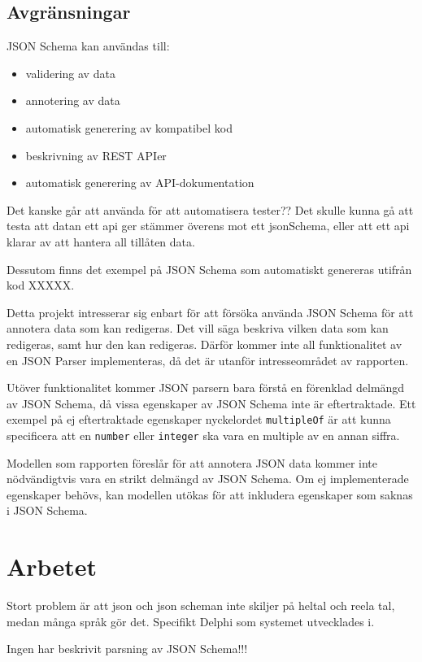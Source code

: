 \documentclass[swedish]{kththesis}
\begin{document}
\section{Avgränsningar}

JSON Schema kan användas till:
\begin{itemize}
	\item validering av data
	\item annotering av data
	\item automatisk generering av kompatibel kod
	\item beskrivning av REST APIer
	\item automatisk generering av API-dokumentation
\end{itemize}

Det kanske går att använda för att automatisera tester?? Det skulle kunna gå att testa att datan ett api ger stämmer överens mot ett jsonSchema, eller att ett api klarar av att hantera all tillåten data.

Dessutom finns det exempel på JSON Schema som automatiskt genereras utifrån kod XXXXX.

Detta projekt intresserar sig enbart för att försöka använda JSON Schema för att annotera data som kan redigeras. Det vill säga beskriva vilken data som kan redigeras, samt hur den kan redigeras. Därför kommer inte all funktionalitet av en JSON Parser implementeras, då det är utanför intresseområdet av rapporten.

Utöver funktionalitet kommer JSON parsern bara förstå en förenklad delmängd av JSON Schema, då vissa egenskaper av JSON Schema inte är eftertraktade. Ett exempel på ej eftertraktade egenskaper nyckelordet \texttt{multipleOf} är att kunna specificera att en \texttt{number} eller \texttt{integer} ska vara en multiple av en annan siffra.

Modellen som rapporten föreslår för att annotera JSON data kommer inte nödvändigtvis vara en strikt delmängd av JSON Schema. Om ej implementerade egenskaper behövs, kan modellen utökas för att inkludera egenskaper som saknas i JSON Schema.

\chapter{Arbetet}

Stort problem är att json och json scheman inte skiljer på heltal och reela tal, medan många språk gör det. Specifikt Delphi som systemet utvecklades i.

Ingen har beskrivit parsning av JSON Schema!!!
\end{document}
